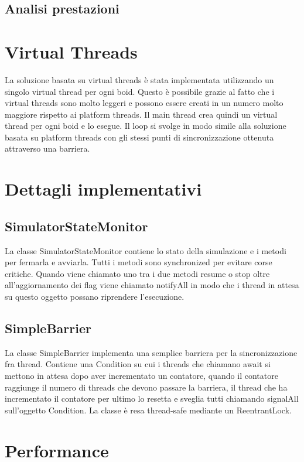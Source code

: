 \documentclass[11pt,notitlepage]{article}
\begin{document}
\subsection{Analisi prestazioni}

\section{Virtual Threads}
La soluzione basata su virtual threads è stata implementata utilizzando un singolo virtual thread per ogni boid. Questo è possibile
grazie al fatto che i virtual threads sono molto leggeri e possono essere creati in un numero molto maggiore rispetto ai platform threads.
Il main thread crea quindi un virtual thread per ogni boid e lo esegue. Il loop si svolge in modo simile alla soluzione basata su platform threads con gli stessi punti
di sincronizzazione ottenuta attraverso una barriera.

\section{Dettagli implementativi}
\subsection{SimulatorStateMonitor}
La classe \textsf{SimulatorStateMonitor} contiene lo stato della simulazione e i metodi per fermarla e avviarla. Tutti i metodi sono \textsf{synchronized} per evitare
corse critiche. Quando viene chiamato uno tra i due metodi \textsf{resume} o \textsf{stop} oltre all'aggiornamento dei flag viene chiamato \textsf{notifyAll} in modo
che i thread in attesa su questo oggetto possano riprendere l'esecuzione.

\subsection{SimpleBarrier}
La classe \textsf{SimpleBarrier} implementa una semplice barriera per la sincronizzazione fra thread. Contiene una \textsf{Condition} su cui i threads che chiamano
\textsf{await} si mettono in attesa dopo aver incrementato un contatore, quando il contatore raggiunge il numero di threads che devono passare la barriera, il 
thread che ha incrementato il contatore per ultimo lo resetta e sveglia tutti chiamando \textsf{signalAll} sull'oggetto \textsf{Condition}.
La classe è resa thread-safe mediante un \textsf{ReentrantLock}.

\section{Performance}
\end{document}
